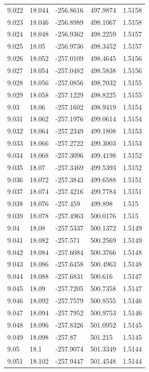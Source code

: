\begin{tabular}{lllll}
9.022 & 18.044 & -256.8616 & 497.9874 & 1.5158 \\
9.023 & 18.046 & -256.8989 & 498.1067 & 1.5158 \\
9.024 & 18.048 & -256.9362 & 498.2259 & 1.5157 \\
9.025 & 18.05 & -256.9736 & 498.3452 & 1.5157 \\
9.026 & 18.052 & -257.0109 & 498.4645 & 1.5156 \\
9.027 & 18.054 & -257.0482 & 498.5838 & 1.5156 \\
9.028 & 18.056 & -257.0856 & 498.7032 & 1.5155 \\
9.029 & 18.058 & -257.1229 & 498.8225 & 1.5155 \\
9.03 & 18.06 & -257.1602 & 498.9419 & 1.5154 \\
9.031 & 18.062 & -257.1976 & 499.0614 & 1.5154 \\
9.032 & 18.064 & -257.2349 & 499.1808 & 1.5153 \\
9.033 & 18.066 & -257.2722 & 499.3003 & 1.5153 \\
9.034 & 18.068 & -257.3096 & 499.4198 & 1.5152 \\
9.035 & 18.07 & -257.3469 & 499.5393 & 1.5152 \\
9.036 & 18.072 & -257.3843 & 499.6588 & 1.5151 \\
9.037 & 18.074 & -257.4216 & 499.7784 & 1.5151 \\
9.038 & 18.076 & -257.459 & 499.898 & 1.515 \\
9.039 & 18.078 & -257.4963 & 500.0176 & 1.515 \\
9.04 & 18.08 & -257.5337 & 500.1372 & 1.5149 \\
9.041 & 18.082 & -257.571 & 500.2569 & 1.5149 \\
9.042 & 18.084 & -257.6084 & 500.3766 & 1.5148 \\
9.043 & 18.086 & -257.6458 & 500.4963 & 1.5148 \\
9.044 & 18.088 & -257.6831 & 500.616 & 1.5147 \\
9.045 & 18.09 & -257.7205 & 500.7358 & 1.5147 \\
9.046 & 18.092 & -257.7579 & 500.8555 & 1.5146 \\
9.047 & 18.094 & -257.7952 & 500.9753 & 1.5146 \\
9.048 & 18.096 & -257.8326 & 501.0952 & 1.5145 \\
9.049 & 18.098 & -257.87 & 501.215 & 1.5145 \\
9.05 & 18.1 & -257.9074 & 501.3349 & 1.5144 \\
9.051 & 18.102 & -257.9447 & 501.4548 & 1.5144 \\

\end{tabular}
